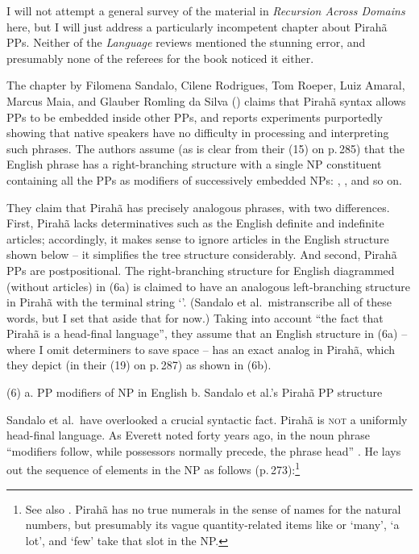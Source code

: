 \documentclass[output=paper,colorlinks,citecolor=brown
]{langscibook}
\begin{document}
I will not attempt a general survey of the material in
\textit{Recursion Across Domains} here, but I will just address a
particularly incompetent chapter about Pirah{\~a} PPs. Neither of
the \textit{Language} reviews mentioned the stunning error, and
presumably none of the referees for the book noticed it either.

The chapter by Filomena Sandalo, Cilene Rodrigues, Tom Roeper, Luiz Amaral,
Marcus Maia, and Glauber Romling da Silva (\citeyear{SandaloEtAl18})
claims that Pirah{\~a} syntax allows PPs to be embedded inside other PPs,
and reports experiments purportedly showing that native speakers have no
difficulty in processing and interpreting such phrases. The authors assume
(as is clear from their (15) on p.\,285) that the English phrase
 has a
right-branching structure with a single NP constituent containing
all the PPs as modifiers of successively embedded NPs:
,
, and so on.

They claim that Pirah{\~a} has precisely analogous phrases, with two
differences. First, Pirah{\~a} lacks determinatives such as the English
definite and indefinite articles; accordingly, it makes sense to ignore
articles in the English structure shown below -- it simplifies the tree
structure considerably.  And second, Pirah{\~a} PPs are postpositional.
The right-branching structure for English diagrammed (without articles)
in (6a) is claimed to have an analogous left-branching structure in
Pirah{\~a} with the terminal string `'. (Sandalo et al.\ mistranscribe all of these
words, but I set that aside that for now.) Taking into account ``the
fact that Pirah{\~a} is a head-final language'', they assume that an
English structure in (6a) -- where I omit determiners to save space
-- has an exact analog in Pirah{\~a}, which they depict
(in their (19) on p.\,287) as shown in (6b).

\noindent
(6) a. PP modifiers of NP in English\hspace*{3ex}
    b. Sandalo et al.'s Pirah{\~a} PP structure

\nopagebreak[4]

\noindent
\hspace*{1.5em}
\hspace*{2em}

\noindent
Sandalo et al.\ have overlooked a crucial syntactic fact. Pirah{\~a} is
\textsc{not} a uniformly head-final language. As Everett noted forty
years ago, in the noun phrase ``modifiers follow, while possessors normally
precede, the phrase head'' \citep[272]{Everett86HAL}. He lays out
the sequence of elements in the NP as follows
(p.\,273):\footnote{\label{nonumerals}
   See also \citet[132ff]{Everett83}. Pirah{\~a} has no true
   numerals in the sense of names for the natural numbers, but presumably
   its vague quantity-related items like  or
    `many',
    `a lot', and
    `few' take that slot in the NP.}
\end{document}
